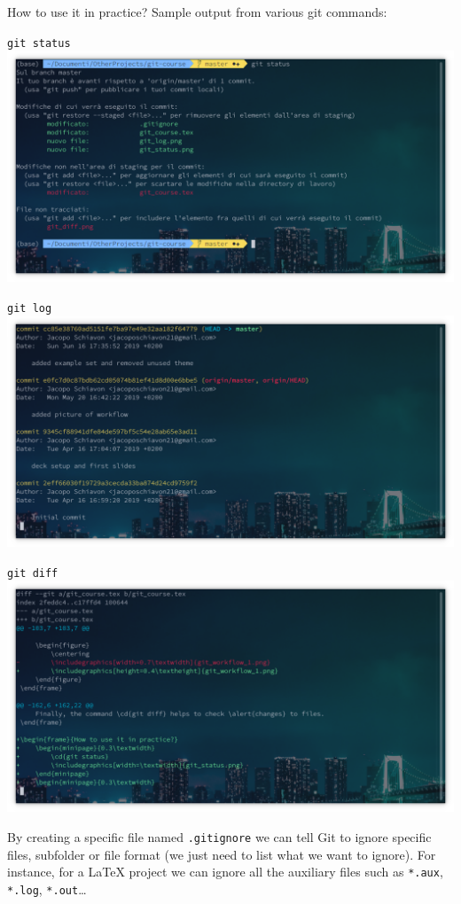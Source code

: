 \documentclass[aspectratio=169]{beamer}
\newcommand{\git}{Git{}}
\newcommand{\cd}[1]{\texttt{#1}}
\begin{document}
\begin{frame}{How to use it in practice?}
    Sample output from various git commands:
    
    \begin{minipage}{0.32\textwidth}
        \cd{git status}
        \includegraphics[width=\textwidth]{git_status.png}
    \end{minipage}
    \begin{minipage}{0.32\textwidth}
        \cd{git log}
        \includegraphics[width=\textwidth]{git_log.png}
    \end{minipage}
    \begin{minipage}{0.32\textwidth}
        \cd{git diff}
        \includegraphics[width=\textwidth]{git_diff.png}
    \end{minipage}

    By creating a specific file named \cd{.gitignore} we can tell \git{} to \alert{ignore} specific files, subfolder or file format (we just need to list what we want to ignore). For instance, for a \LaTeX{} project we can ignore all the auxiliary files such as \cd{*.aux}, \cd{*.log}, \cd{*.out}\dots
\end{frame}
\end{document}
